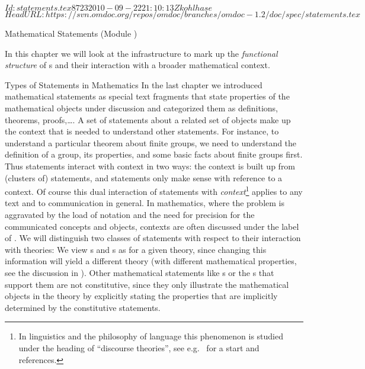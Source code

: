 \svnInfo $Id: statements.tex 8723 2010-09-22 21:10:13Z kohlhase $
\svnKeyword $HeadURL: https://svn.omdoc.org/repos/omdoc/branches/omdoc-1.2/doc/spec/statements.tex $

\begin{tchapter}[id=statements,short=Mathematical Statements]{Mathematical Statements (Module {})}

  In this chapter we will look at the {\omdoc} infrastructure to mark up the
  {\emph{functional structure}} of {s} and their
  interaction with a broader mathematical context.
  
\begin{tsection}[id=statements-constitutive]{Types of Statements in Mathematics}
  In the last chapter we introduced mathematical statements as special text fragments that
  state properties of the mathematical objects under discussion and categorized them as
  definitions, theorems, proofs,\ldots. A set of statements about a related set of objects
  make up the context that is needed to understand other statements.  For instance, to
  understand a particular theorem about finite groups, we need to understand the
  definition of a group, its properties, and some basic facts about finite groups
  first. Thus statements interact with context in two ways: the context is built up from
  (clusters of) statements, and statements only make sense with reference to a context. Of
  course this dual interaction of statements with {\emph{context}}\footnote{In linguistics
    and the philosophy of language this phenomenon is studied under the heading of
    ``discourse theories{}'', see e.g.~\cite{KamRey:fdtl93} for a
    start and references.}  applies to any text and to communication in general. In
  mathematics, where the problem is aggravated by the load of notation and the need for
  precision for the communicated concepts and objects, contexts are often discussed under
  the label of {}. We will
  distinguish two classes of statements with respect to their interaction with theories:
  We view {s} and {s} as {} for a
  given theory, since changing this information will yield a different theory (with
  different mathematical properties, see the discussion in {}).  Other
  mathematical statements like {s} or the {s} that
  support them are not constitutive, since they only illustrate the mathematical objects
  in the theory by explicitly stating the properties that are implicitly determined by the
  constitutive statements.
  

\end{tsection}
\end{tchapter}
